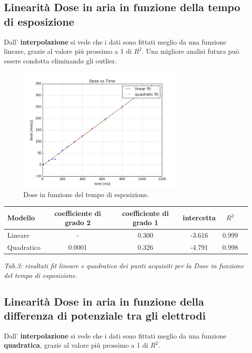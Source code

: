 \documentclass[a4paper]{article}
\begin{document}
\subsection{Linearità Dose in aria in funzione della tempo di esposizione}
Dall' \textbf{interpolazione} si vede che i dati sono fittati meglio da una funzione lineare, grazie al valore più prossimo a 1 di $R^{2}$. Una migliore analisi futura può essere condotta eliminando gli outlier.
\begin{figure}[H]
\centering
\includegraphics[width=0.75\textwidth]{dosevstime.png}
\caption{Dose in funzione del tempo di esposizione.}
\end{figure}

\begin{center} 
		
		\begin{tabular}{lccccc}
			\hline
			\hline
			\textbf{Modello}	& \textbf{coefficiente di grado 2}& \textbf{coefficiente di grado 1}& \textbf{intercetta}&  \textbf{$R^{2}$} 	 \\
			\hline
			\hline
			Lineare	&-&0.300&-3.616&0.999	\\
			Quadratico	&0.0001&0.326&-4.791&0.998\\
			
			
			\hline
			\hline
		\end{tabular}
		\linebreak
		\emph{Tab.3: risultati fit lineare e quadratico dei punti acquisiti per la Dose in funzione del tempo di esposizione.} 
	\end{center}
\subsection{Linearità Dose in aria in funzione della differenza di potenziale tra gli elettrodi}
Dall' \textbf{interpolazione} si vede che i dati sono fittati meglio da una funzione \textbf{quadratica}, grazie al valore più prossimo a 1 di $R^{2}$. 
\end{document}
